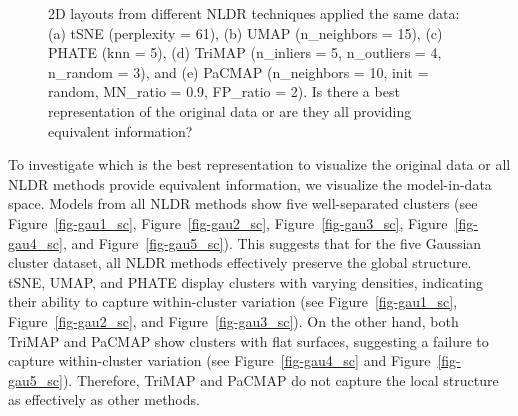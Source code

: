 \documentclass[
  12pt]{article}
\begin{document}
\begin{figure}[H]


\caption{\label{fig-nldervis5Gau}2D layouts from different NLDR
techniques applied the same data: (a) tSNE (perplexity = 61), (b) UMAP
(n\_neighbors = 15), (c) PHATE (knn = 5), (d) TriMAP (n\_inliers = 5,
n\_outliers = 4, n\_random = 3), and (e) PaCMAP (n\_neighbors = 10, init
= random, MN\_ratio = 0.9, FP\_ratio = 2). Is there a best
representation of the original data or are they all providing equivalent
information?}

\end{figure}%

To investigate which is the best representation to visualize the
original data or all NLDR methods provide equivalent information, we
visualize the model-in-data space. Models from all NLDR methods show
five well-separated clusters (see Figure~\ref{fig-gau1_sc},
Figure~\ref{fig-gau2_sc}, Figure~\ref{fig-gau3_sc},
Figure~\ref{fig-gau4_sc}, and Figure~\ref{fig-gau5_sc}). This suggests
that for the five Gaussian cluster dataset, all NLDR methods effectively
preserve the global structure. tSNE, UMAP, and PHATE display clusters
with varying densities, indicating their ability to capture
within-cluster variation (see Figure~\ref{fig-gau1_sc},
Figure~\ref{fig-gau2_sc}, and Figure~\ref{fig-gau3_sc}). On the other
hand, both TriMAP and PaCMAP show clusters with flat surfaces,
suggesting a failure to capture within-cluster variation (see
Figure~\ref{fig-gau4_sc} and Figure~\ref{fig-gau5_sc}). Therefore,
TriMAP and PaCMAP do not capture the local structure as effectively as
other methods.
\end{document}
